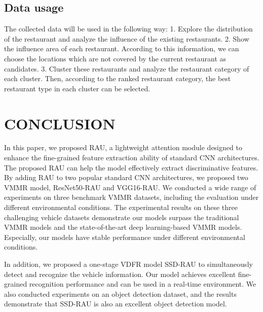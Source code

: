 \documentclass[14pt, conference, onecolumn]{IEEEtran}
\begin{document}
\subsection{Data usage}
The collected data will be used in the following way: 
1. Explore the distribution of the restaurant and analyze the influence of the existing restaurants. 
2. Show the influence area of each restaurant. According to this information, we can choose the locations which are not covered by the current restaurant as candidates.
3. Cluster these restaurants and analyze the restaurant category of each cluster. Then, according to the ranked restaurant category, the best restaurant type in each cluster can be selected.


\section{CONCLUSION}
\label{sec:conclusion}
In this paper, we proposed RAU, a lightweight attention module designed to enhance the fine-grained feature extraction ability of standard CNN architectures. The proposed RAU can help the model effectively extract discriminative features. By adding RAU to two popular standard CNN architectures, we proposed two VMMR model, ResNet50-RAU and VGG16-RAU. We conducted a wide range of experiments on three benchmark VMMR datasets, including the evaluation under different environmental conditions. The experimental results on these three challenging vehicle datasets demonstrate our models surpass the traditional VMMR models and the state-of-the-art deep learning-based VMMR models. Especially, our models have stable performance under different environmental conditions. 

In addition, we proposed a one-stage VDFR model SSD-RAU to simultaneously detect and recognize the vehicle information. Our model achieves excellent fine-grained recognition performance and can be used in a real-time environment. We also conducted experiments on an object detection dataset, and the results demonstrate that SSD-RAU is also an excellent object detection model.






\end{document}
